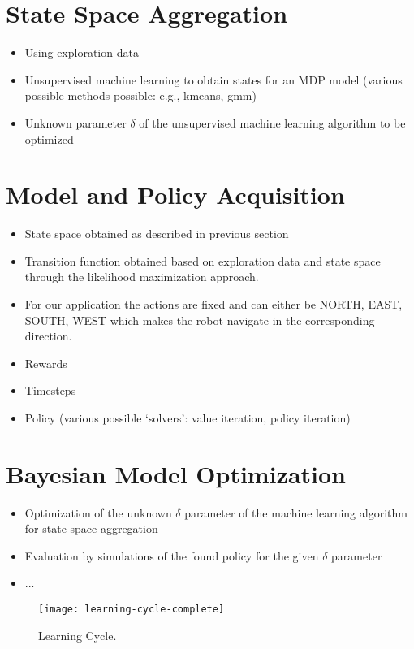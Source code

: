\section{State Space Aggregation}
\label{sec:state-space-aggregation}

% 

\begin{itemize}
	\item Using exploration data
	\item Unsupervised machine learning to obtain states for an MDP model (various possible methods possible: e.g., kmeans, gmm)
	\item Unknown parameter $\delta$ of the unsupervised machine learning algorithm to be optimized
\end{itemize}

\section{Model and Policy Acquisition}
\label{sec:model-policy-acquisition}

% 

\begin{itemize}
	\item State space obtained as described in previous section
	\item Transition function obtained based on exploration data and state space through the likelihood maximization approach.
	\item For our application the actions are fixed and can either be \textsc{NORTH}, \textsc{EAST}, \textsc{SOUTH}, \textsc{WEST} which makes the robot navigate in the corresponding direction.
	\item Rewards
	\item Timesteps
	\item Policy (various possible `solvers': value iteration, policy iteration)
\end{itemize}

\section{Bayesian Model Optimization}
\label{sec:bayesian-model-optimization}

% 

\begin{itemize}
	\item Optimization of the unknown $\delta$ parameter of the machine learning algorithm for state space aggregation
	\item Evaluation by simulations of the found policy for the given $\delta$ parameter
	\item ...
\end{itemize}

\begin{figure}[t]
	\centering
	\texttt{[image: learning-cycle-complete]}
	\caption{Learning Cycle.}
	\label{fig:learning-cycle-complete}
\end{figure}
